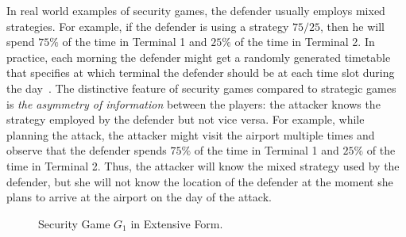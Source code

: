 \documentclass[letterpaper]{article}
\begin{document}
In real world examples of security games, the defender usually employs mixed strategies. For example, if the defender is using a strategy $75/25$, then he will spend $75\%$ of the time in Terminal 1 and $25\%$ of the time in Terminal 2. In practice, each morning the defender might get a randomly generated timetable that specifies at which terminal the defender should be at each time slot during the day~\cite{jtpkrto10interfaces}. The distinctive feature of security games compared to strategic games is {\em the asymmetry of information} between the players: the attacker knows the strategy employed by the defender but not vice versa. For example, while planning the attack, the attacker might visit the airport multiple times and observe that the defender spends $75\%$ of the time in Terminal 1 and $25\%$ of the time in Terminal 2. Thus, the attacker will know the mixed strategy used by the defender, but she will not know the location of the defender at the moment she plans to arrive at the airport on the day of the attack.

\begin{figure}[ht]
\begin{center}
\vspace{0mm}
\vspace{0mm}
\caption{Security Game $G_1$ in Extensive Form.}\label{extensive-form-game figure}
\end{center}
\end{figure}
\end{document}
